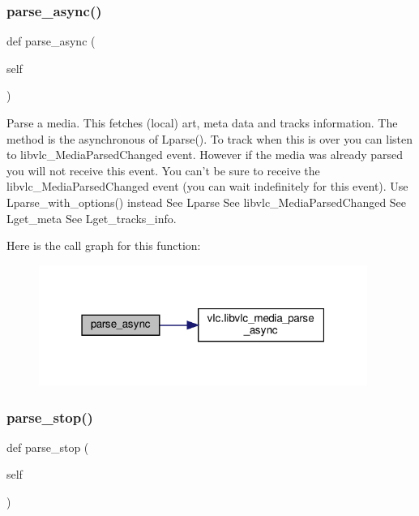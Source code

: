 \subsubsection{\texorpdfstring{parse\+\_\+async()}{parse\_async()}}
{\footnotesize\ttfamily def parse\+\_\+async (\begin{DoxyParamCaption}\item[{}]{self }\end{DoxyParamCaption})}

\begin{DoxyVerb}Parse a media.
This fetches (local) art, meta data and tracks information.
The method is the asynchronous of L{parse}().
To track when this is over you can listen to libvlc_MediaParsedChanged
event. However if the media was already parsed you will not receive this
event.
\deprecated You can't be sure to receive the libvlc_MediaParsedChanged
    event (you can wait indefinitely for this event).
    Use L{parse_with_options}() instead
See L{parse}
See libvlc_MediaParsedChanged
See L{get_meta}
See L{get_tracks_info}.
\end{DoxyVerb}
 Here is the call graph for this function\+:
\nopagebreak
\begin{figure}[H]
\begin{center}
\leavevmode
\includegraphics[width=304pt]{classvlc_1_1_media_a186ebdfb2e9a5ad6709213c61d7e3094_cgraph}
\end{center}
\end{figure}
\mbox{\label{classvlc_1_1_media_a2c7754adad2befe128c3a1ec5c914d67}} 
\subsubsection{\texorpdfstring{parse\+\_\+stop()}{parse\_stop()}}
{\footnotesize\ttfamily def parse\+\_\+stop (\begin{DoxyParamCaption}\item[{}]{self }\end{DoxyParamCaption})}


